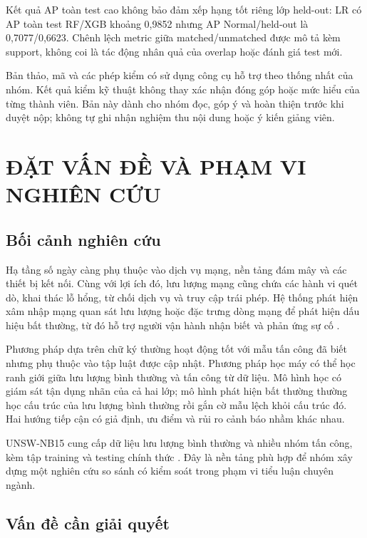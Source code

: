\documentclass[12pt,a4paper,oneside]{report}
\begin{document}
Kết quả AP toàn test cao không bảo đảm xếp hạng tốt riêng lớp held-out: LR có AP toàn test RF/XGB khoảng 0,9852 nhưng AP Normal/held-out là 0,7077/0,6623. Chênh lệch metric giữa matched/unmatched được mô tả kèm support, không coi là tác động nhân quả của overlap hoặc đánh giá test mới.

Bản thảo, mã và các phép kiểm có sử dụng công cụ hỗ trợ theo thống nhất của nhóm. Kết quả kiểm kỹ thuật không thay xác nhận đóng góp hoặc mức hiểu của từng thành viên. Bản này dành cho nhóm đọc, góp ý và hoàn thiện trước khi duyệt nộp; không tự ghi nhận nghiệm thu nội dung hoặc ý kiến giảng viên.

\clearpage{}
\chapter{ĐẶT VẤN ĐỀ VÀ PHẠM VI NGHIÊN CỨU}

\section{Bối cảnh nghiên cứu}

Hạ tầng số ngày càng phụ thuộc vào dịch vụ mạng, nền tảng đám mây và các thiết bị kết nối. Cùng với lợi ích đó, lưu lượng mạng cũng chứa các hành vi quét dò, khai thác lỗ hổng, từ chối dịch vụ và truy cập trái phép. Hệ thống phát hiện xâm nhập mạng quan sát lưu lượng hoặc đặc trưng dòng mạng để phát hiện dấu hiệu bất thường, từ đó hỗ trợ người vận hành nhận biết và phản ứng sự cố \cite{nist80094}.

Phương pháp dựa trên chữ ký thường hoạt động tốt với mẫu tấn công đã biết nhưng phụ thuộc vào tập luật được cập nhật. Phương pháp học máy có thể học ranh giới giữa lưu lượng bình thường và tấn công từ dữ liệu. Mô hình học có giám sát tận dụng nhãn của cả hai lớp; mô hình phát hiện bất thường thường học cấu trúc của lưu lượng bình thường rồi gắn cờ mẫu lệch khỏi cấu trúc đó. Hai hướng tiếp cận có giả định, ưu điểm và rủi ro cảnh báo nhầm khác nhau.

UNSW-NB15 cung cấp dữ liệu lưu lượng bình thường và nhiều nhóm tấn công, kèm tập training và testing chính thức \cite{moustafa2015,moustafa2016,unswsite}. Đây là nền tảng phù hợp để nhóm xây dựng một nghiên cứu so sánh có kiểm soát trong phạm vi tiểu luận chuyên ngành.

\section{Vấn đề cần giải quyết}
\end{document}

